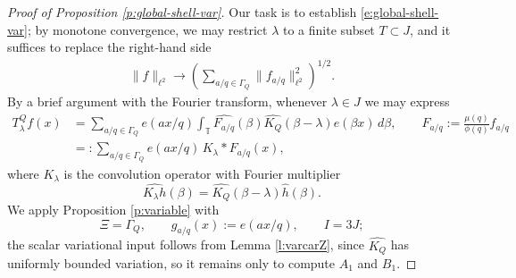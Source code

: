 \documentclass[12pt]{amsart}
\numberwithin{equation}{section}
\newtheorem{lemma}[theorem]{Lemma}
\theoremstyle{definition}
\begin{document}

\begin{proof}[Proof of Proposition \ref{p:global-shell-var}]
Our task is to establish \eqref{e:global-shell-var}; by monotone convergence, we may restrict \(\lambda\) to a finite subset \(T \subset J\), and it suffices to replace the right-hand side
\begin{align}
    \| f \|_{\ell^2} \longrightarrow (\sum_{a/q \in \Gamma_Q} \| f_{a/q} \|_{\ell^2}^2)^{1/2}.
\end{align}
By a brief argument with the Fourier transform, whenever $\lambda \in J$ we may express
\begin{align}
    T_\lambda^Q f(x)
    &=
    \sum_{a/q\in\Gamma_Q}
    e(a x/q)
    \int_{\mathbb T}
    \widehat{F_{a/q}}(\beta)
    \widehat{K_Q}(\beta-\lambda)e(\beta x)\,d\beta, \qquad F_{a/q}:=\frac{\mu(q)}{\phi(q)}f_{a/q} \\
    & =: \sum_{a/q\in\Gamma_Q}
    e(a x/q)\,K_\lambda*F_{a/q}(x),
\end{align}
where \(K_\lambda\) is the convolution operator with Fourier multiplier
\[
    \widehat{K_\lambda h}(\beta)
    =
    \widehat{K_Q}(\beta-\lambda)\widehat h(\beta).
\]
We apply Proposition \ref{p:variable} with
\[
    \Xi=\Gamma_Q,
    \qquad
    g_{a/q}(x):=e(a x/q),
    \qquad
    I=3J;
\]
the scalar variational input follows from Lemma
\ref{l:varcarZ}, since \(\widehat{K_Q}\) has uniformly bounded variation, so it remains only to compute \(A_1\) and \(B_1\).


\end{proof}
\end{document}
